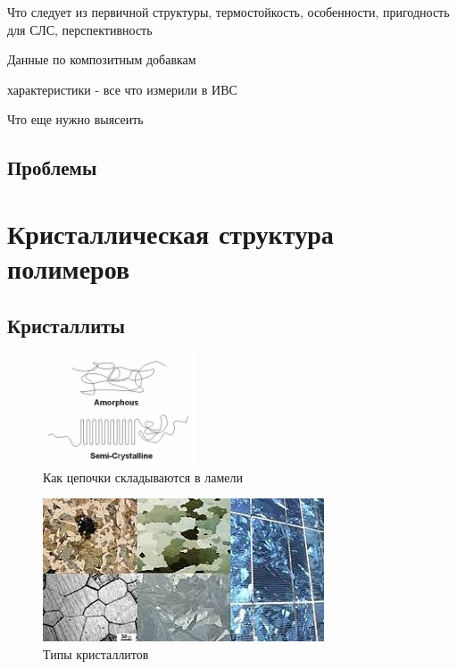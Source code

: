 Что следует из первичной структуры, термостойкость, особенности, пригодность для СЛС, перспективность

Данные по композитным добавкам

характеристики - все что измерили в ИВС

Что еще нужно выясеить

\subsection{Проблемы}



\section{Кристаллическая структура полимеров}
\subsection{Кристаллиты}

	\begin{figure} 
\vspace{-20pt}
  \begin{center}
    \includegraphics[width=0.4\textwidth]{fig/crystal-1.png}
    \caption{Как цепочки складываются в ламели}
    \label{fig:crystal-1}
  \end{center}
  \vspace{-20pt}
  \vspace{1pt}
\end{figure}



\begin{figure}[h]
    \includegraphics[width=\textwidth]{fig/crystallites.jpg}
    \caption{Типы кристаллитов}
    \label{fig:crystallites}
\end{figure}



